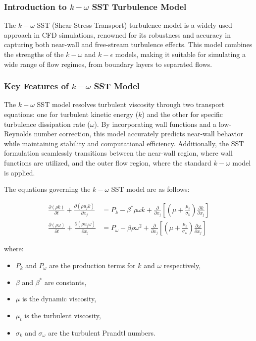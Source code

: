 \subsubsection{Introduction to \(k-\omega\) SST Turbulence Model}

The \(k-\omega\) SST (Shear-Stress Transport) turbulence model is a widely used approach in CFD simulations, renowned for its robustness and accuracy in capturing both near-wall and free-stream turbulence effects. This model combines the strengths of the \(k-\omega\) and \(k-\epsilon\) models, making it suitable for simulating a wide range of flow regimes, from boundary layers to separated flows.

\subsubsection{Key Features of \(k-\omega\) SST Model}

The \(k-\omega\) SST model resolves turbulent viscosity through two transport equations: one for turbulent kinetic energy (\(k\)) and the other for specific turbulence dissipation rate (\(\omega\)). By incorporating wall functions and a low-Reynolds number correction, this model accurately predicts near-wall behavior while maintaining stability and computational efficiency. Additionally, the SST formulation seamlessly transitions between the near-wall region, where wall functions are utilized, and the outer flow region, where the standard \(k-\omega\) model is applied.

The equations governing the \(k-\omega\) SST model are as follows:

\begin{align*}
\frac{\partial (\rho k)}{\partial t} + \frac{\partial (\rho u_j k)}{\partial x_j} &= P_k - \beta^* \rho \omega k + \frac{\partial}{\partial x_j} \left[ \left( \mu + \frac{\mu_t}{\sigma_k} \right) \frac{\partial k}{\partial x_j} \right] \\
\frac{\partial (\rho \omega)}{\partial t} + \frac{\partial (\rho u_j \omega)}{\partial x_j} &= P_\omega - \beta \rho \omega^2 + \frac{\partial}{\partial x_j} \left[ \left( \mu + \frac{\mu_t}{\sigma_\omega} \right) \frac{\partial \omega}{\partial x_j} \right]
\end{align*}

where:
\begin{itemize}
    \item \(P_k\) and \(P_\omega\) are the production terms for \(k\) and \(\omega\) respectively,
    \item \(\beta\) and \(\beta^*\) are constants,
    \item \(\mu\) is the dynamic viscosity,
    \item \(\mu_t\) is the turbulent viscosity,
    \item \(\sigma_k\) and \(\sigma_\omega\) are the turbulent Prandtl numbers.
\end{itemize}

